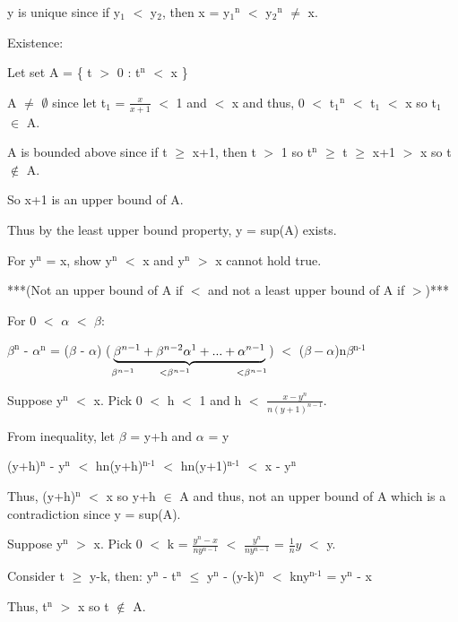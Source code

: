 y is unique since if y$_{1}$ $<$ y$_{2}$, then x = y$_{1}$$^\text{n}$ $<$ y$_{2}$$^\text{n}$ $\neq$ x.

{ \color{lblue} Existence: }

Let set A = \{ t $>$ 0 : t$^\text{n}$ $<$ x \}

A $\not =$ $\emptyset$ since let t$_{1}$ = $\frac{x}{x+1}$ $<$ 1 and $<$ x
and thus, 0 $<$ t$_{1}$$^\text{n}$ $<$ t$_{1}$ $<$ x so t$_{1}$ $\in$ A.

A is bounded above since if t $ \geq $ x+1, then
t $>$ 1 so t$^\text{n}$ $ \geq $ t $ \geq $ x+1 $>$ x so t $\not \in$ A.

So x+1 is an upper bound of A.

Thus by the least upper bound property, y = sup(A) exists.

For y$^\text{n}$ = x, show y$^\text{n}$ $<$ x and y$^\text{n}$ $>$ x cannot hold true.

***(Not an upper bound of A if $<$ and not a least upper bound of A if $>$)***

For 0 $<$ $\alpha$ $<$ $\beta$:

\qquad $\beta ^\text{n}$ - $\alpha^\text{n}$
= ($\beta$ - $\alpha$)
	($\underbrace{\beta^{n-1} + \beta^{n-2}\alpha^1 + ... + \alpha^{n-1}}
	_{\beta^{n-1} \hspace{0.7cm} <\beta^{n-1} \hspace{1.3cm} <\beta^{n-1}}$)
$<$ ($\beta - \alpha$)n$\beta$$^\text{n-1}$ 

Suppose y$^\text{n}$ $<$ x. Pick 0 $<$ h $<$ 1 and h $<$ $\frac{x-y^n}{n(y+1)^{n-1}}$.

\qquad From inequality, let $\beta$ = y+h and $\alpha$ = y

\qquad \qquad (y+h)$^\text{n}$ - y$^\text{n}$ $<$ hn(y+h)$^\text{n-1}$
$<$ hn(y+1)$^\text{n-1}$ $<$ x - y$^\text{n}$

\begin{adjustbox}{minipage=14.2cm, right}
	Thus, (y+h)$^\text{n}$ $<$ x so y+h $\in$ A and thus, not an upper bound of A
	which is a contradiction since y = sup(A).
\end{adjustbox}

Suppose y$^\text{n}$ $>$ x.
Pick 0 $<$ k = $\frac{y^n - x}{ny^{n-1}}$ $<$ $\frac{y^n}{ny^{n-1}}$
= $\frac{1}{n}y$ $<$ y.

\qquad Consider t $ \geq $  y-k, then:
y$^\text{n}$ - t$^\text{n}$ $ \leq $  y$^\text{n}$ - (y-k)$^\text{n}$ $<$
kny$^\text{n-1}$ = y$^\text{n}$ - x

\qquad Thus, t$^\text{n}$ $>$ x so t $\not \in$ A.

